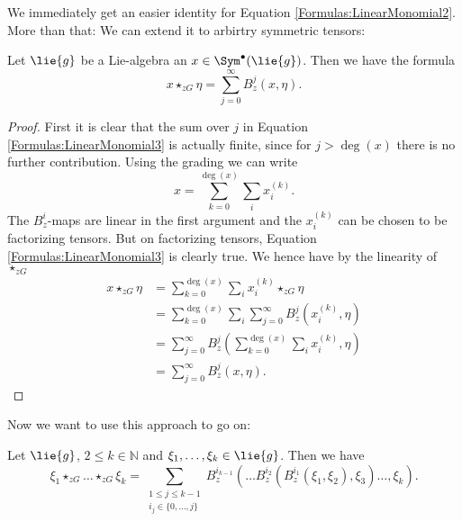 We immediately get an easier identity for Equation 
\eqref{Formulas:LinearMonomial2}. More than that: We can extend it to 
arbirtry symmetric tensors:
\begin{lemma}
	\label{Lemma:LinearMonimial3}
	Let $\lie{g}$ be a Lie-algebra an $x \in \Sym^{\bullet}(\lie{g})$. 
	Then we have the formula
	\begin{equation}
		\label{Formulas:LinearMonomial3}
		x \star_{zG} \eta
    	=
    	\sum\limits_{j=0}^{\infty}
    	B_z^j(x, \eta).
	\end{equation}
\end{lemma}
\begin{proof}
	First it is clear that the sum over $j$ in Equation 
	\eqref{Formulas:LinearMonomial3} is actually finite, since for $j 
	> \deg(x)$ there is no further contribution. Using the grading we 
	can write
	\begin{equation*}
		x 
		= 
		\sum\limits_{k=0}^{\deg(x)}
		\sum_i x_i^{(k)}.
	\end{equation*}
	The $B_z^i$-maps are linear in the first argument and the 
	$x_i^{(k)}$ can be chosen to be factorizing tensors. But on 
	factorizing tensors, Equation \eqref{Formulas:LinearMonomial3} is 
	clearly true. We hence have by the linearity of $\star_{zG}$
	\begin{align*}
		x \star_{zG} \eta
		& =
		\sum\limits_{k=0}^{\deg(x)}
		\sum_i 
		x_i^{(k)}
		\star_{zG} \eta
		\\
		& =
		\sum\limits_{k=0}^{\deg(x)}
		\sum_i 
		\sum\limits_{j=0}^{\infty}
    	B_z^j(x_i^{(k)}, \eta)
		\\
		& =
		\sum\limits_{j=0}^{\infty}
    	B_z^j
    	\left(
			\sum\limits_{k=0}^{\deg(x)}
			\sum_i 
			x_i^{(k)}, \eta
		\right)
		\\
		& =
    	\sum\limits_{j=0}^{\infty}
    	B_z^j(x, \eta).
	\end{align*}
\end{proof}
Now we want to use this approach to go on:
\begin{proposition}
	\label{Prop:Formulas:MultipleStars}
	Let $\lie{g}$, $2 \leq k \in \mathbb{N}$  and $\xi_1, \ldots, \xi_k 
	\in \lie{g}$. Then we have
	\begin{equation*}
		\xi_1 \star_{zG} \ldots \star_{zG} \xi_k		
		=
		\sum\limits_{\substack{
			1 \leq j \leq k-1 \\
			i_j \in \{0, \ldots, j\}
		}}
		B_z^{i_{k-1}}
		\left(
			\ldots B_z^{i_2}
			\left(
				B_z^{i_1} 
				\left( \xi_1, \xi_2 \right)
				, \xi_3	
			\right) 
			\ldots, \xi_{k}
		\right).
	\end{equation*}
\end{proposition}
